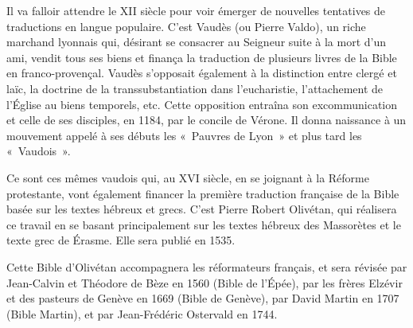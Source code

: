 \begin{small}
Il va falloir attendre le XII siècle pour voir émerger de nouvelles tentatives de traductions en langue populaire. C'est Vaudès (ou Pierre Valdo), un riche marchand lyonnais qui, désirant se consacrer au Seigneur suite à la mort d'un ami, vendit tous ses biens et finança la traduction de plusieurs livres de la Bible en franco-provençal. Vaudès s'opposait également à la distinction entre clergé et laïc, la doctrine de la transsubstantiation dans l'eucharistie, l'attachement de l'Église au biens temporels, etc. Cette opposition entraîna son excommunication et celle de ses disciples, en 1184, par le concile de Vérone. Il donna naissance à un mouvement appelé à ses débuts les «~Pauvres de Lyon~» et plus tard les «~Vaudois~».\bigskip

Ce sont ces mêmes vaudois qui, au XVI siècle, en se joignant à la Réforme protestante, vont également financer la première traduction française de la Bible basée sur les textes hébreux et grecs. C'est Pierre Robert Olivétan, qui réalisera ce travail en se basant principalement sur les textes hébreux des Massorètes et le texte grec de Érasme. Elle sera publié en 1535.\bigskip

Cette Bible d'Olivétan accompagnera les réformateurs français, et sera révisée par Jean-Calvin et Théodore de Bèze en 1560 (Bible de l'Épée), par les frères Elzévir et des pasteurs de Genève en 1669 (Bible de Genève), par David Martin en 1707 (Bible Martin), et par Jean-Frédéric Ostervald en 1744.
\end{small}
